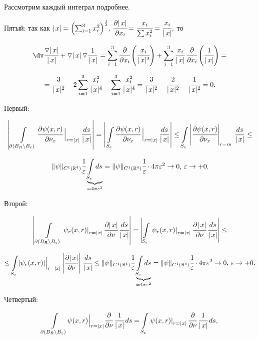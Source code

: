\documentclass[12pt,a4paper,draft]{article}
\DeclareRobustCommand*{\т}{~--- }
\DeclareRobustCommand*{\ч}{~-- }
\begin{document}
Рассмотрим каждый интеграл подробнее.

Пятый: так как
$|\,x|=\Bigl(\sum_{i=1}^3x_i^2\Bigr)^{\frac12},\,\cfrac{\partial|\,x|}{\partial
x_i}=\cfrac {x_i}{\sum x_i^2}=\cfrac {x_i}{|\,x|},$ то

$$\dv
\cfrac{\triangledown |\,x|}{|\,x|} +\triangledown|\,x|\,
\triangledown\frac1{|\,x|}=\sum_{i=1}^3\cfrac{\partial}{\partial
x_i}\left(\cfrac {x_i}{|\,x|^2}\right)+ \sum_{i=1}^3\cfrac
{x_i}{|\,x|}\,\cfrac{\partial}{\partial
x_i}\left(\cfrac1{|\,x|}\right)=$$

$$=\cfrac 3{|\,x|^2}-2\sum_{i=1}^3\cfrac{x_i^2}{|\,x|^4}-\sum_{i=1}^3\cfrac{x_i^2}{|\,x|^4}=
\cfrac 3{|\,x|^2}-\cfrac 2{|\,x|^2}-\cfrac 1{|\,x|^2}=0.$$

Первый:

$$\left|\,\Bigl.\int\limits_{\partial(B_R\setminus B_{\varepsilon})}
\cfrac{\partial\psi(x,r)}{\partial
\nu_x}\,\Bigr|_{r=|x|}\,\frac{ds}{|\,x|}\right|=
\left|\,\Bigl.\int\limits_{S_{\varepsilon}}
\cfrac{\partial\psi(x,r)}{\partial
\nu_x}\,\Bigr|_{r=|x|}\,\frac{ds}{|\,x|}\right|\le
\int\limits_{S_{\varepsilon}}\left|\cfrac{\partial\psi(x,r)}{\partial
\nu_x}\right|_{r=m}\,\frac{ds}{|\,x|}\le$$

$$\|\psi\|_{C^1(\mathbb R^4)}\cfrac1{\varepsilon}
\underbrace{\int\limits_{S_{\varepsilon}}ds}_{=4\pi\varepsilon^2}=
\|\psi\|_{C^1(\mathbb
R^4)}\cfrac1{\varepsilon}\cdot4\pi\varepsilon^2\to0,\,\varepsilon\to+0.$$

Второй:

$$\left|\,\int\limits_{\partial(B_R\setminus B_{\varepsilon})}
\left.\psi_r(x,r)\right|_{r=|x|}\cfrac{\partial |\,x|}{\partial
\nu}\,\cfrac{ds}{|\,x|}\right|=
\left|\int\limits_{S_{\varepsilon}}\left.\psi_r(x,r)\right|_{r=|x|}\cfrac{\partial
|\,x|}{\partial \nu}\,\cfrac{ds}{|\,x|}\right|\le$$

$$\le\int\limits_{S_{\varepsilon}}\Bigl.|\psi_r(x,r)|\Bigr|_{r=|x|}\left|\cfrac{\partial
|\,x|}{\partial \nu}\right|\,\cfrac{ds}{|\,x|}\le
\|\psi\|_{C^1(\mathbb R^4)}\cfrac1{\varepsilon}
\underbrace{\int\limits_{S_{\varepsilon}}ds}_{=4\pi\varepsilon^2}=
\|\psi\|_{C^1(\mathbb
R^4)}\cfrac1{\varepsilon}\cdot4\pi\varepsilon^2\to0,\,\varepsilon\to+0.$$

Четвертый:

$$\int\limits_{\partial(B_R\setminus B_{\varepsilon})}
\Bigl.\psi(x,r)\Bigr|_{r=|x|}\cfrac{\partial }{\partial
\nu}\,\cfrac1{|\,x|}\,ds=
\int\limits_{S_{\varepsilon}}\left.\psi(x,r)\right|_{r=|x|}\cfrac{\partial}{\partial
\nu}\,\cfrac1{|\,x|}\,ds,$$
\end{document}
